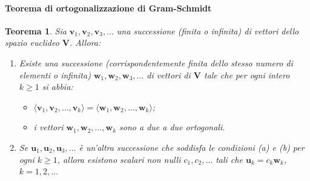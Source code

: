 \documentclass{article}
\theoremstyle{plain}
\newtheorem{thm}{Teorema}[section]
\theoremstyle{definition}
\theoremstyle{remark}
\begin{document}
\paragraph{Teorema di ortogonalizzazione di Gram-Schmidt}
\begin{bxthm}\label{diciassettequattro}
\begin{thm}
Sia $\mathbf{v}_1, \mathbf{v}_2, \mathbf{v}_3, \ldots$ una successione (finita o infinita) di vettori dello spazio euclideo $\mathbf{V}$. 
Allora:
\begin{enumerate}
    \item Esiste una successione (corrispondentemente finita dello stesso numero di elementi o infinita) $\mathbf{w}_1, \mathbf{w}_2, \mathbf{w}_3, \ldots$ 
    di vettori di $\mathbf{V}$ tale che per ogni intero $k \geq 1$ si abbia:
    \begin{itemize}
        \item[(a)] $\langle \mathbf{v}_1, \mathbf{v}_2, \ldots, \mathbf{v}_k \rangle = \langle \mathbf{w}_1, \mathbf{w}_2, \ldots, \mathbf{w}_k \rangle$;
        \item[(b)] i vettori $\mathbf{w}_1, \mathbf{w}_2, \ldots, \mathbf{w}_k$ sono a due a due ortogonali.
    \end{itemize}
    \item Se $\mathbf{u}_1, \mathbf{u}_2, \mathbf{u}_3, \ldots$ è un'altra successione che soddisfa le condizioni 
    (a) e (b) per ogni $k \geq 1$, allora esistono scalari non nulli $c_1, c_2, \ldots$ tali che 
    $\mathbf{u}_k = c_k \mathbf{w}_k$, $k = 1, 2, \ldots$
\end{enumerate}
\end{thm}    
\end{bxthm}
\end{document}
